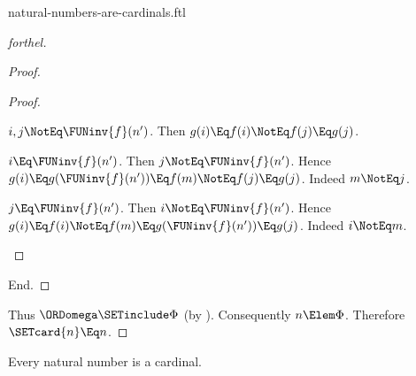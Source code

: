 \documentclass{stex}
\begin{document}
\begin{smodule}{natural-numbers-are-cardinals.ftl}
\begin{proof}[forthel]
\begin{proof}
\begin{proof}
        \begin{case}{$i, j \NotEq \FUNinv{f}(n')$.}
          Then $g(i)
            \Eq f(i)
            \NotEq f(j)
            \Eq g(j)$.
        \end{case}

        \begin{case}{$i \Eq \FUNinv{f}(n')$.}
          Then $j \NotEq \FUNinv{f}(n')$.
          Hence $g(i)
            \Eq g(\FUNinv{f}(n'))
            \Eq f(m)
            \NotEq f(j)
            \Eq g(j)$.
          Indeed $m \NotEq j$.
        \end{case}

        \begin{case}{$j \Eq \FUNinv{f}(n')$.}
          Then $i \NotEq \FUNinv{f}(n')$.
          Hence $g(i)
            \Eq f(i)
            \NotEq f(m)
            \Eq g(\FUNinv{f}(n'))
            \Eq g(j)$.
          Indeed $i \NotEq m$.
        \end{case}
      \end{proof}
    End.
  \end{proof}

  Thus $\ORDomega \SETinclude \Phi$ (by ).
  Consequently $n \Elem \Phi$.
  Therefore $\SETcard{n} \Eq n$.
\end{proof}

\begin{corollary}[forthel]
  Every natural number is a cardinal.
\end{corollary}
\end{smodule}
\end{document}
